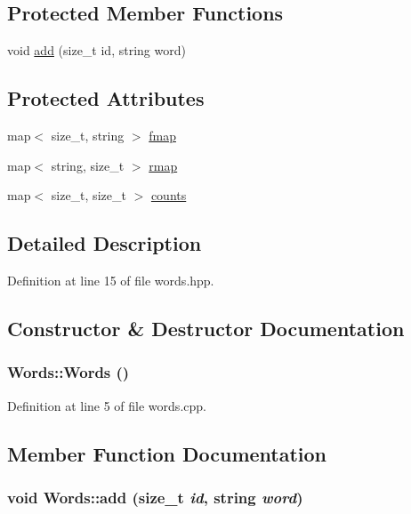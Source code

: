 \subsection*{Protected Member Functions}
\begin{DoxyCompactItemize}
\item 
void \hyperlink{class_words_a2e789250ffeb8d5ef88ee36dc89439cc}{add} (size\_\-t id, string word)
\end{DoxyCompactItemize}
\subsection*{Protected Attributes}
\begin{DoxyCompactItemize}
\item 
map$<$ size\_\-t, string $>$ \hyperlink{class_words_a5ee8f73254e0c6df23e2ceca6a1c9fab}{fmap}
\item 
map$<$ string, size\_\-t $>$ \hyperlink{class_words_ace9dafad0716c11b073bd3b306ff1316}{rmap}
\item 
map$<$ size\_\-t, size\_\-t $>$ \hyperlink{class_words_aa40f09ffa14222f1c174915e506c175a}{counts}
\end{DoxyCompactItemize}


\subsection{Detailed Description}


Definition at line 15 of file words.hpp.



\subsection{Constructor \& Destructor Documentation}
\hypertarget{class_words_a7bf5a1cffddebace28da162a366fed0c}{
\subsubsection[{Words}]{\setlength{\rightskip}{0pt plus 5cm}Words::Words ()}}
\label{class_words_a7bf5a1cffddebace28da162a366fed0c}


Definition at line 5 of file words.cpp.



\subsection{Member Function Documentation}
\hypertarget{class_words_a2e789250ffeb8d5ef88ee36dc89439cc}{
\subsubsection[{add}]{\setlength{\rightskip}{0pt plus 5cm}void Words::add (size\_\-t {\em id}, \/  string {\em word})}}
\label{class_words_a2e789250ffeb8d5ef88ee36dc89439cc}


